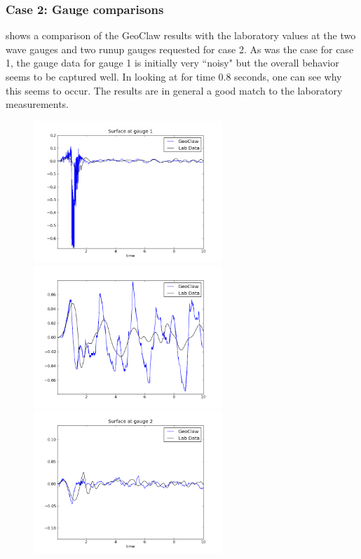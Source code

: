 \subsubsection{Case 2: Gauge comparisons}

 shows a comparison of the GeoClaw results with the
laboratory values at the two wave gauges and two runup gauges requested
for case 2.  As was the case for case 1, the gauge data for gauge 1 is initially
very ``noisy" but the overall behavior seems to be captured well.  In looking at
 for time 0.8 seconds, one can see why this seems to 
occur.  The results are in general a good match to the laboratory
measurements.

\begin{figure}[ht]
\hfil\includegraphics[width=2.8in]{bp12/case2wavegauge1.png}\hfil
\hfil\includegraphics[width=2.8in]{bp12/case2runupgauge2.png}\hfil
\vskip 5pt
\hfil\includegraphics[width=2.8in]{bp12/case2wavegauge2.png}\hfil

\end{figure}
